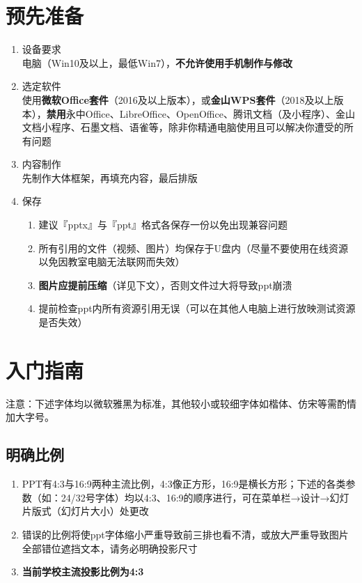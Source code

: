 \section[预先准备]{预先准备}
\begin{enumerate}
    \item 设备要求\\
          电脑（Win10及以上，最低Win7），\textbf{不允许使用手机制作与修改}
    \item 选定软件\\
          使用\textbf{微软Office套件}（2016及以上版本），或\textbf{金山WPS套件}（2018及以上版本），\textbf{禁用}永中Office、LibreOffice、OpenOffice、腾讯文档（及小程序）、金山文档小程序、石墨文档、语雀等，除非你精通电脑使用且可以解决你遭受的所有问题
    \item 内容制作\\
          先制作大体框架，再填充内容，最后排版
    \item 保存
          \begin{enumerate}
              \item 建议『pptx』与『ppt』格式各保存一份以免出现兼容问题
              \item 所有引用的文件（视频、图片）均保存于U盘内（尽量不要使用在线资源以免因教室电脑无法联网而失效）
              \item \textbf{图片应提前压缩}（详见下文），否则文件过大将导致ppt崩溃
              \item 提前检查ppt内所有资源引用无误（可以在其他人电脑上进行放映测试资源是否失效）
          \end{enumerate}
\end{enumerate}

\section[入门指南]{入门指南}
注意：下述字体均以微软雅黑为标准，其他较小或较细字体如楷体、仿宋等需酌情加大字号。

\subsection[明确比例]{明确比例}
\begin{enumerate}
    \item PPT有4:3与16:9两种主流比例，4:3像正方形，16:9是横长方形；下述的各类参数（如：24/32号字体）均以4:3、16:9的顺序进行，可在菜单栏→设计→幻灯片版式（幻灯片大小）处更改
    \item 错误的比例将使ppt字体缩小严重导致前三排也看不清，或放大严重导致图片全部错位遮挡文本，请务必明确投影尺寸
    \item \textbf{当前学校主流投影比例为4:3}
\end{enumerate}

